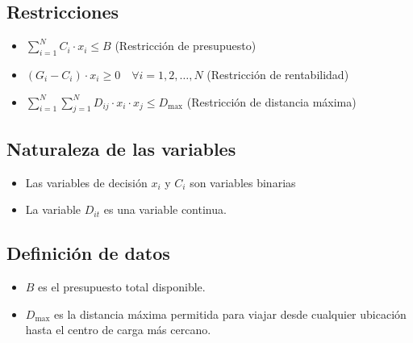 \documentclass[letterpaper]{article}
\begin{document}
\begin{flushleft}
		\subsection{Restricciones}
		\begin{itemize}
			\item $\sum_{i=1}^{N} C_i \cdot x_i \leq B$ (Restricción de presupuesto)
			\item $(G_i - C_i) \cdot x_i \geq 0 \quad \forall i=1,2,\ldots,N$ (Restricción de rentabilidad)
			\item $\sum_{i=1}^{N} \sum_{j=1}^{N} D_{ij} \cdot x_i \cdot x_j \leq D_{\text{max}}$ (Restricción de distancia máxima)
		\end{itemize}
		\subsection{Naturaleza de las variables}
		\begin{itemize}
			\item Las variables de decisión $x_i$ y $C_i$ son variables binarias
			\item La variable $D_{it}$ es una variable continua.
		\end{itemize}
		\subsection{Definición de datos}
		\begin{itemize}
			\item $B$ es el presupuesto total disponible.
			\item $D_{\text{max}}$ es la distancia máxima permitida para viajar desde cualquier ubicación hasta el centro de carga más cercano.
		\end{itemize}
		
	\end{flushleft}
	
\end{document}
